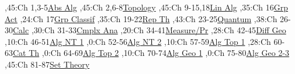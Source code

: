 
\bgroup
\renewcommand{\href}[1]{} %
\hypersetup{linkcolor=black} %
\renewcommand{\solidwidth}{0.7pt}
\renewcommand{\boldwidth}{1.5pt}

\setcounter{diagheight}{50}
\begin{chart}
,45:{Ch 1,3-5}{\hyperref[part:absalg]{Abs Alg}}{}
,45:{Ch 2,6-8}{\hyperref[part:basictop]{Topology}}{}
,45:{Ch 9-15,18}{\hyperref[part:linalg]{Lin Alg}}{}
,35:{Ch 16}{\hyperref[part:groups]{Grp Act}}{}
,24:{Ch 17}{\hyperref[ch:sylow]{Grp Classif}}{}
,35:{Ch 19-22}{\hyperref[part:repth]{Rep Th}}{}
,43:{Ch 23-25}{\hyperref[part:quantum]{Quantum}}{}
,38:{Ch 26-30}{\hyperref[part:calc]{Calc}}{}
,30:{Ch 31-33}{\hyperref[part:cmplxana]{Cmplx Ana}}{}
,20:{Ch 34-41}{\hyperref[part:measure]{Measure/Pr}}{}
,28:{Ch 42-45}{\hyperref[part:diffgeo]{Diff Geo}}{}
,10:{Ch 46-51}{\hyperref[part:algnt1]{Alg NT 1}}{}
,0:{Ch 52-56}{\hyperref[part:algnt2]{Alg NT 2}}{}
,10:{Ch 57-59}{\hyperref[part:algtop1]{Alg Top 1}}{}
,28:{Ch 60-63}{\hyperref[part:cats]{Cat Th}}{}
,0:{Ch 64-69}{\hyperref[part:algtop2]{Alg Top 2}}{}
,10:{Ch 70-74}{\hyperref[part:ag1]{Alg Geo 1}}{}
,0:{Ch 75-80}{\hyperref[part:ag2]{Alg Geo 2-3}}{}
,45:{Ch 81-87}{\hyperref[part:st1]{Set Theory}}{}


\end{chart}
